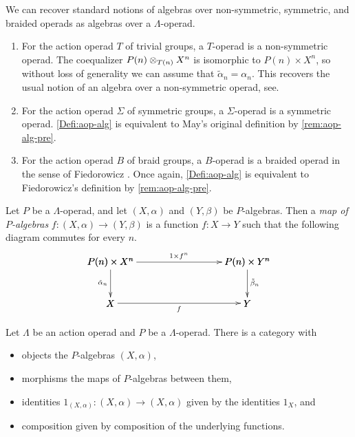 \begin{example}\label{ex:lop-alg-exs}
We can recover standard notions of algebras over non-symmetric, symmetric, and braided operads as algebras over a $\Lambda$-operad.
  \begin{enumerate}
    \item For the action operad $T$ of trivial groups, a $T$-operad is a non-symmetric operad. The coequalizer $\coeq{P}{X}{T}{n}$ is isomorphic to $P(n) \times X^n$, so without loss of generality we can assume that $\tilde{\alpha}_n=\alpha_n$. This recovers the usual notion of an algebra over a non-symmetric operad, see.
    \item For the action operad $\Sigma$ of symmetric groups, a $\Sigma$-operad is a symmetric operad. \cref{Defi:aop-alg} is equivalent to May's original definition by \cref{rem:aop-alg-pre}.
    \item For the action operad $B$ of braid groups, a $B$-operad is a braided operad in the sense of Fiedorowicz \cite{fie-br}. Once again, \cref{Defi:aop-alg} is equivalent to Fiedorowicz's definition by \cref{rem:aop-alg-pre}.
  \end{enumerate}
\end{example}


\begin{Defi}\label{Defi:map-palg}
Let $P$ be a $\Lambda$-operad, and let $(X, \alpha)$ and $(Y, \beta)$ be $P$-algebras. Then a \emph{map of $P$-algebras} $f \colon  (X, \alpha) \rightarrow (Y, \beta)$ is a function $f \colon X \rightarrow Y$ such that the following diagram commutes for every $n$.
  \[
    \xy
      {\ar^{1 \times f^{n}} (0,0)*+{P(n) \times X^{n}}; (50,0)*+{P(n) \times Y^{n}} };
      {\ar^{\tilde{\beta}_{n}} (50,0)*+{P(n) \times Y^{n}}; (50,-15)*+{Y} };
      {\ar_{\tilde{\alpha}_{n}} (0,0)*+{P(n) \times X^{n}}; (0,-15)*+{X} };
      {\ar_{f} (0,-15)*+{X}; (50,-15)*+{Y} };
    \endxy
  \]
\end{Defi}

\begin{prop}\label{prop:cat-of-Palg}
Let $\Lambda$ be an action operad and $P$ be a $\Lambda$-operad.
There is a category with 
\begin{itemize}
\item objects the $P$-algebras $(X, \alpha)$, 
\item morphisms the maps of $P$-algebras between them,
\item identities $1_{(X, \alpha)} \colon (X, \alpha) \to (X, \alpha)$ given by the identities $1_X$, and
\item composition given by composition of the underlying functions.
\end{itemize}
\end{prop}

